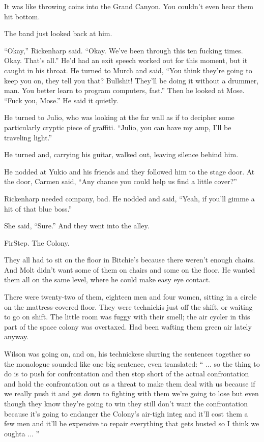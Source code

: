 It was like throwing coins into the Grand Canyon. You couldn't even hear them hit bottom.

The band just looked back at him.

``Okay,'' Rickenharp said. ``Okay. We've been through this ten fucking times. Okay. That's all.'' He'd had an exit speech worked out for this moment, but it caught in his throat. He turned to Murch and said, ``You think they're going to keep you on, they tell you that? Bullshit! They'll be doing it without a drummer, man. You better learn to program computers, fast.'' Then he looked at Mose. ``Fuck you, Mose.'' He said it quietly.

He turned to Julio, who was looking at the far wall as if to decipher some particularly cryptic piece of graffiti. ``Julio, you can have my amp, I'll be traveling light.''

He turned and, carrying his guitar, walked out, leaving silence behind him.

He nodded at Yukio and his friends and they followed him to the stage door. At the door, Carmen said, ``Any chance you could help us find a little cover?''

Rickenharp needed company, bad. He nodded and said, ``Yeah, if you'll gimme a hit of that blue boss.''

She said, ``Sure.'' And they went into the alley.

FirStep. The Colony.

They all had to sit on the floor in Bitchie's because there weren't enough chairs. And Molt didn't want some of them on chairs and some on the floor. He wanted them all on the same level, where he could make easy eye contact.

There were twenty-two of them, eighteen men and four women, sitting in a circle on the mattress-covered floor. They were technickis just off the shift, or waiting to go on shift. The little room was fuggy with their smell; the air cycler in this part of the space colony was overtaxed. Had been wafting them green air lately anyway.

Wilson was going on, and on, his technickese slurring the sentences together so the monologue sounded like one big sentence, even translated: `` ... so the thing to do is to push for confrontation and then stop short of the actual confrontation and hold the confrontation out as a threat to make them deal with us because if we really push it and get down to fighting with them we're going to lose but even though they know they're going to win they still don't want the confrontation because it's going to endanger the Colony's air-tigh integ and it'll cost them a few men and it'll be expensive to repair everything that gets busted so I think we oughta ... ''

